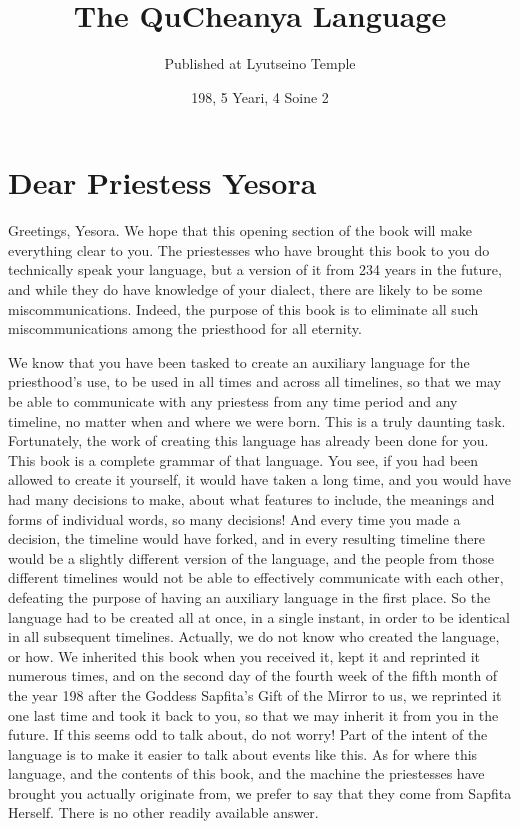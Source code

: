 \documentclass{article}
\title{The QuCheanya Language}
\date{198, 5 Yeari, 4 Soine 2}
\author{Published at Lyutseino Temple}
\begin{document}
\newcommand{\entry}[3]{\textbf{#1}\ \textit{#2}\ $\bullet$\ {#3}}
\newcommand{\scap}[1]{{\smaller #1}}
\newcommand{\scapp}[2]{{\smaller #1}.{\smaller #2}}
\newcommand{\scappp}[3]{{\smaller #1}.{\smaller #2}.{\smaller #3}}

\maketitle
\tableofcontents \newpage

\part{Dear Priestess Yesora}
Greetings, Yesora.  We hope that this opening section of the book will make everything clear to you.  The priestesses who have brought this book to you do technically speak your language, but a version of it from 234 years in the future, and while they do have knowledge of your dialect, there are likely to be some miscommunications.  Indeed, the purpose of this book is to eliminate all such miscommunications among the priesthood for all eternity.

We know that you have been tasked to create an auxiliary language for the priesthood's use, to be used in all times and across all timelines, so that we may be able to communicate with any priestess from any time period and any timeline, no matter when and where we were born.  This is a truly daunting task.  Fortunately, the work of creating this language has already been done for you.  This book is a complete grammar of that language.  You see, if you had been allowed to create it yourself, it would have taken a long time, and you would have had many decisions to make, about what features to include, the meanings and forms of individual words, so many decisions!  And every time you made a decision, the timeline would have forked, and in every resulting timeline there would be a slightly different version of the language, and the people from those different timelines would not be able to effectively communicate with each other, defeating the purpose of having an auxiliary language in the first place.  So the language had to be created all at once, in a single instant, in order to be identical in all subsequent timelines.  Actually, we do not know who created the language, or how.  We inherited this book when you received it, kept it and reprinted it numerous times, and on the second day of the fourth week of the fifth month of the year 198 after the Goddess Sapfita's Gift of the Mirror to us, we reprinted it one last time and took it back to you, so that we may inherit it from you in the future.  If this seems odd to talk about, do not worry!  Part of the intent of the language is to make it easier to talk about events like this.  As for where this language, and the contents of this book, and the machine the priestesses have brought you actually originate from, we prefer to say that they come from Sapfita Herself.  There is no other readily available answer.
\end{document}

